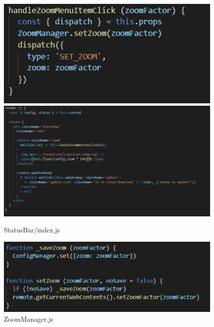 \documentclass[main.tex]{subfiles}
\begin{document}
\begin{figure}[htbp]
\includegraphics[scale=0.6]{images/handlerZoom.png}\\
\includegraphics[scale=0.4]{images/render.png}
\centering
\caption{StatusBar/index.js}
\label{fig:statusbarindex}
\end{figure}

\begin{figure}[htbp]
\includegraphics[scale=0.7]{images/zoomManager.png}
\centering
\caption{ZoomManager.js}
\label{fig:zoommanager}
\end{figure}
\end{document}
